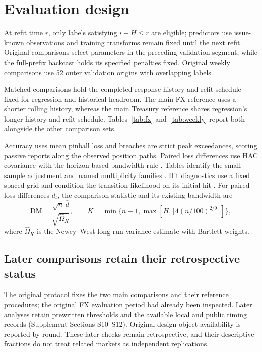 \documentclass{rQUF2e}
\begin{document}
\FloatBarrier

\section{Evaluation design}\label{sec:evaluation}

At refit time \(r\), only labels satisfying \(i+H\le r\) are eligible; predictors use issue-known observations and training transforms remain fixed until the next refit. Original comparisons select parameters in the preceding validation segment, while the full-prefix backcast holds its specified penalties fixed. Original weekly comparisons use 52 outer validation origins with overlapping labels.

Matched comparisons hold the completed-response history and refit schedule fixed for regression and historical headroom. The main FX reference uses a shorter rolling history, whereas the main Treasury reference shares regression's longer history and refit schedule. Tables~\ref{tab:fx} and~\ref{tab:weekly} report both alongside the other comparison sets.

Accuracy uses mean pinball loss and breaches are strict peak exceedances, scoring passive reports along the observed position paths. Paired loss differences use HAC covariance with the horizon-based bandwidth rule \citep{nw1987,dm1995}. Tables identify the small-sample adjustment and named multiplicity families \citep{holm1979,hln1997}. Hit diagnostics use a fixed spaced grid and condition the transition likelihood on its initial hit \citep{kupiec1995,christ1998}.
For paired loss differences \(d_t\), the comparison statistic and its existing bandwidth are
\[
\mathrm{DM}=\frac{\sqrt n\,\bar d}{\sqrt{\widehat\Omega_K}},\qquad
K=\min\{n-1,\max[H,\lfloor4(n/100)^{2/9}\rfloor]\},
\]
where \(\widehat\Omega_K\) is the Newey--West long-run variance estimate with Bartlett weights.


\subsection{Later comparisons retain their retrospective status}

The original protocol fixes the two main comparisons and their reference procedures; the original FX evaluation period had already been inspected. Later analyses retain prewritten thresholds and the available local and public timing records (Supplement Sections S10--S12). Original design-object availability is reported by round. These later checks remain retrospective, and their descriptive fractions do not treat related markets as independent replications.
\end{document}

